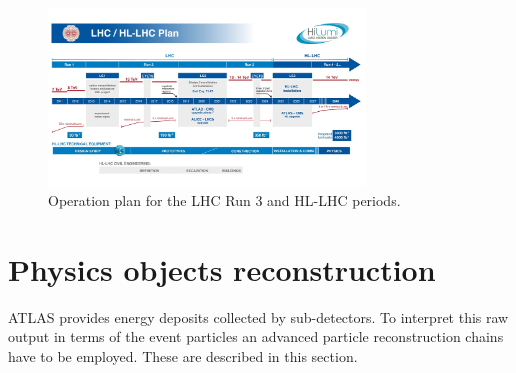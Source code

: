 \begin{figure}[htbp]
    \centering
    \includegraphics[width=0.75\textwidth]{Ch2/Img/HL-LHC-January-2021_small.jpg}
    \caption{Operation plan for the LHC Run 3 and HL-LHC periods.}
    \label{fig:chap2:Upgrad}
\end{figure}

\section{Physics objects reconstruction}
\label{chap2:Objects}
ATLAS provides energy deposits collected by sub-detectors. To interpret this raw output in terms of the event particles an advanced particle reconstruction chains have to be employed. These are described in this section.

